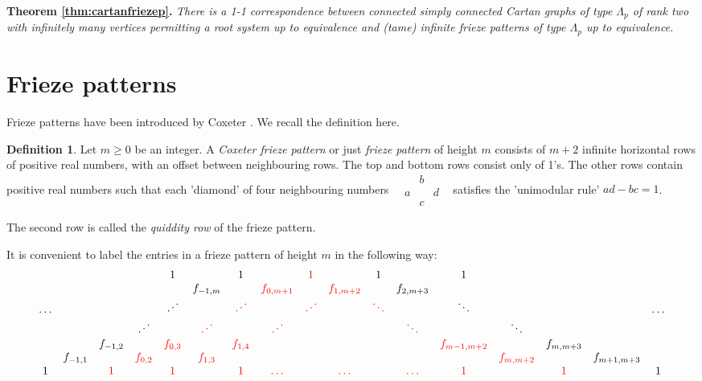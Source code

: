 \documentclass[11pt,a4paper]{amsart}
\newcommand{\red}{\color{red}}
\theoremstyle{definition}
\newtheorem{Definition}[Lemma]{Definition}
\numberwithin{equation}{section}
\begin{document}
\medskip

\noindent
{\bf Theorem \ref{thm:cartanfriezep}.}
{\em 
There is a 1-1 correspondence between connected simply connected Cartan graphs of type $\Lambda_p$ of rank two with infinitely many 
vertices permitting a root system
up to equivalence and (tame) infinite frieze patterns of type $\Lambda_p$ up to equivalence.
}



\section{Frieze patterns} \label{sec:friezes}

Frieze patterns have been introduced by Coxeter \cite{Cox71}. We recall the definition here. 

\begin{Definition} \label{def:frieze}
Let $m\ge 0$ be an integer. 
A {\em Coxeter frieze pattern} or just {\em frieze pattern}
of height $m$ consists of $m+2$ infinite horizontal rows of positive real numbers, with an
offset between neighbouring rows. The top and bottom rows consist only of 1's. The other rows contain
positive real numbers such that each 'diamond' of four neighbouring numbers\,\,\,\,
$\begin{matrix} & b & \\ a & & d \\ & c & \end{matrix}$\,\,\,
satisfies the 'unimodular rule' $ad-bc=1$. 

The second row is called the {\em quiddity row} of the frieze pattern. 
\smallskip

It is convenient to label the entries in a frieze pattern of height $m$ in the following way: 
{\small
$$\begin{array}{ccccccccccccccccc}
& & & & 1 & & 1 & & {\red 1} & & 1 & & 1 & & & & \\
& & & & & f_{-1,m} & & {\red f_{0,m+1}} & & {\red f_{1,m+2}} & & f_{2,m+3} & & & \\
\ldots & & & & \iddots & & {\red \iddots} & & {\red \iddots}  & & {\red \ddots} & & \ddots & & & & \ldots \\
 & & & \iddots & & {\red \iddots} & & {\red \iddots}  & & & & {\red \ddots} & & \ddots & & &  \\
& & f_{-1,2} & & {\red f_{0,3}} & & {\red f_{1,4}} & &  & & & & {\red f_{m-1,m+2}} & & f_{m,m+3} & & \\
& f_{-1,1} & & {\red f_{0,2}} & & {\red f_{1,3}} & & &  & & & & & {\red f_{m,m+2}} & & f_{m+1,m+3} & \\
1 & & {\red 1} & & {\red 1} & & {\red 1} & {\red \ldots} & & {\red \ldots} & & {\red \ldots} & {\red 1} & & {\red 1} & & 1\\
\end{array}
$$
}
\end{Definition}
\end{document}
